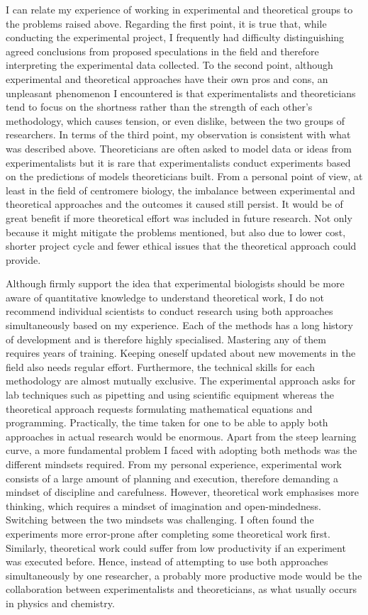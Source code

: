 I can relate my experience of working in experimental and theoretical groups to the problems \cite{Fidelman1985TheModeling} raised above. Regarding the first point, it is true that, while conducting the experimental project, I frequently had difficulty distinguishing agreed conclusions from proposed speculations in the field and therefore interpreting the experimental data collected. To the second point, although experimental and theoretical approaches have their own pros and cons, an unpleasant phenomenon I encountered is that experimentalists and theoreticians tend to focus on the shortness rather than the strength of each other's methodology, which causes tension, or even dislike, between the two groups of researchers. In terms of the third point, my observation is consistent with what was described above. Theoreticians are often asked to model data or ideas from experimentalists but it is rare that experimentalists conduct experiments based on the predictions of models theoreticians built. From a personal point of view, at least in the field of centromere biology, the imbalance between experimental and theoretical approaches and the outcomes it caused still persist. It would be of great benefit if more theoretical effort was included in future research. Not only because it might mitigate the problems mentioned, but also due to lower cost, shorter project cycle and fewer ethical issues that the theoretical approach could provide. 

Although firmly support the idea that experimental biologists should be more aware of quantitative knowledge to understand theoretical work, I do not recommend individual scientists to conduct research using both approaches simultaneously based on my experience. Each of the methods has a long history of development and is therefore highly specialised. Mastering any of them requires years of training. Keeping oneself updated about new movements in the field also needs regular effort. Furthermore, the technical skills for each methodology are almost mutually exclusive. The experimental approach asks for lab techniques such as pipetting and using scientific equipment whereas the theoretical approach requests formulating mathematical equations and programming. Practically, the time taken for one to be able to apply both approaches in actual research would be enormous. Apart from the steep learning curve, a more fundamental problem I faced with adopting both methods was the different mindsets required. From my personal experience, experimental work consists of a large amount of planning and execution, therefore demanding a mindset of discipline and carefulness. However, theoretical work emphasises more thinking, which requires a mindset of imagination and open-mindedness. Switching between the two mindsets was challenging. I often found the experiments more error-prone after completing some theoretical work first. Similarly, theoretical work could suffer from low productivity if an experiment was executed before. Hence, instead of attempting to use both approaches simultaneously by one researcher, a probably more productive mode would be the collaboration between experimentalists and theoreticians, as what usually occurs in physics and chemistry. 
